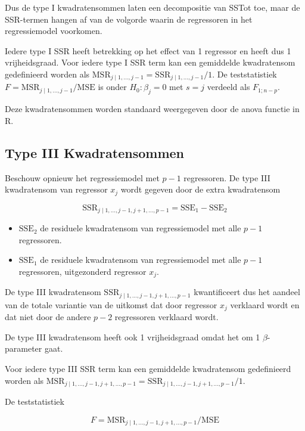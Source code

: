 \documentclass[
  12pt,dutch]{book}
\providecommand{\tightlist}{%
  \setlength{\itemsep}{0pt}\setlength{\parskip}{0pt}}
\theoremstyle{definition}
\theoremstyle{definition}
\theoremstyle{definition}
\theoremstyle{definition}
\theoremstyle{remark}
\begin{document}
Dus de type I kwadratensommen laten een decompositie van SSTot toe, maar de SSR-termen hangen af van de volgorde waarin de regressoren in het regressiemodel voorkomen.

Iedere type I SSR heeft betrekking op het effect van 1 regressor en heeft dus 1 vrijheidsgraad.
Voor iedere type I SSR term kan een gemiddelde kwadratensom gedefinieerd worden als \(\text{MSR}_{j\mid 1,\ldots, j-1}=\text{SSR}_{j\mid 1,\ldots, j-1}/1\).
De teststatistiek \(F=\text{MSR}_{j\mid 1,\ldots, j-1}/\text{MSE}\) is onder \(H_0:\beta_j=0\) met \(s=j\) verdeeld als \(F_{1;n-p}\).

Deze kwadratensommen worden standaard weergegeven door de anova functie in R.

\subsection{Type III Kwadratensommen}\label{type-iii-kwadratensommen}

Beschouw opnieuw het regressiemodel met \(p-1\) regressoren.
De type III kwadratensom van regressor \(x_j\) wordt gegeven door de extra kwadratensom

\[
  \text{SSR}_{j \mid 1,\ldots, j-1,j+1,\ldots, p-1} = \text{SSE}_1-\text{SSE}_2
\]

\begin{itemize}
\tightlist
\item
  \(\text{SSE}_2\) de residuele kwadratensom van regressiemodel met alle \(p-1\) regressoren.
\item
  \(\text{SSE}_1\) de residuele kwadratensom van regressiemodel met alle \(p-1\) regressoren, uitgezonderd regressor \(x_j\).
\end{itemize}

De type III kwadratensom \(\text{SSR}_{j \mid 1,\ldots, j-1,j+1,\ldots, p-1}\) kwantificeert dus het aandeel van de totale variantie van de uitkomst dat door regressor \(x_j\) verklaard wordt en dat niet door de andere \(p-2\) regressoren verklaard wordt.

De type III kwadratensom heeft ook 1 vrijheidsgraad omdat het om 1 \(\beta\)-parameter gaat.

Voor iedere type III SSR term kan een gemiddelde kwadratensom gedefinieerd worden als \(\text{MSR}_{j \mid 1,\ldots, j-1,j+1,\ldots, p-1}=\text{SSR}_{j \mid 1,\ldots, j-1,j+1,\ldots, p-1}/1\).

De teststatistiek

\[
F=\text{MSR}_{j \mid 1,\ldots, j-1,j+1,\ldots, p-1}/\text{MSE}
\]
\end{document}

